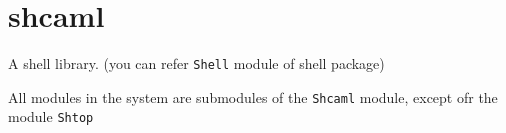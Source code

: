 \section{shcaml}
A shell library. (you can refer \verb|Shell| module of shell package)

All modules in the system are submodules of the \verb|Shcaml| module,
except ofr the module \verb|Shtop|



